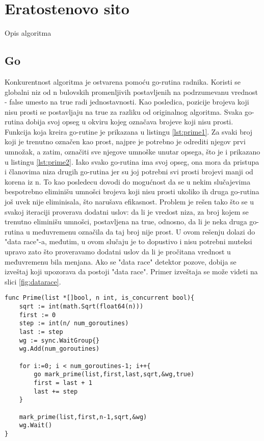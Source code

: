 \documentclass[12pt,oneside]{memoir}
\begin{document}

\section{Eratostenovo sito}
Opis algoritma

\subsection{Go}

Konkurentnost algoritma je ostvarena  pomoću go-rutina radnika. Koristi se globalni niz od n bulovskih promenljivih postavljenih na podrzumevanu vrednost - false umesto na true radi jednostavnosti. Kao posledica, pozicije brojeva koji nisu prosti se postavljaju na true za razliku od originalnog algoritma. Svaka go-rutina dobija svoj opseg u okviru kojeg označava brojeve koji nisu prosti. Funkcija koja kreira go-rutine je prikazana u listingu \ref{lst:prime1}. Za svaki broj koji je trenutno označen kao prost, najpre je potrebno je odrediti njegov prvi umnožak, a zatim, označiti sve njegove umnoške unutar opsega, što je i prikazano u listingu \ref{lst:prime2}. Iako svako go-rutina ima svoj opseg, ona mora da pristupa i članovima niza drugih go-rutina jer su joj potrebni svi prosti brojevi manji od korena iz n. To kao posledecu dovodi do mogućnost da se u nekim slučajevima bespotrebno eliminišu umnošci brojeva koji nisu prosti ukoliko ih druga go-rutina još uvek nije eliminisala, što narušava efikasnost. Problem je rešen tako što se u svakoj iteraciji proverava dodatni uslov: da li je vredost niza, za broj kojem se trenutno eliminišu umnošci, postavljena na true, odnosno, da li je neka druga go-rutina u međuvremenu označila da taj broj nije prost. U ovom rešenju dolazi do "data race"-a, međutim, u ovom slučaju je to dopustivo i nisu potrebni muteksi upravo zato što proveravamo dodatni uslov da li je pročitana vrednost u međuvremenu bila menjana. Ako se "data race"  detektor pozove, dobija se izveštaj koji upozorava da postoji "data race". Primer izveštaja se može videti na slici \ref{fig:datarace}. 

\begin{center}
\begin{lstlisting}[caption=Go implementacija konkurentne funkcije za određivanje prostih brojeva manjih od n,label={lst:prime1},float, backgroundcolor=\color{background}]
func Prime(list *[]bool, n int, is_concurrent bool){
	sqrt := int(math.Sqrt(float64(n)))
	first := 0
	step := int(n/ num_goroutines)
	last := step
	wg := sync.WaitGroup{}
	wg.Add(num_goroutines)

	for i:=0; i < num_goroutines-1; i++{
		go mark_prime(list,first,last,sqrt,&wg,true)
		first = last + 1
		last += step
	}

	mark_prime(list,first,n-1,sqrt,&wg)
	wg.Wait()
}
\end{lstlisting}
\end{center}
\end{document}

